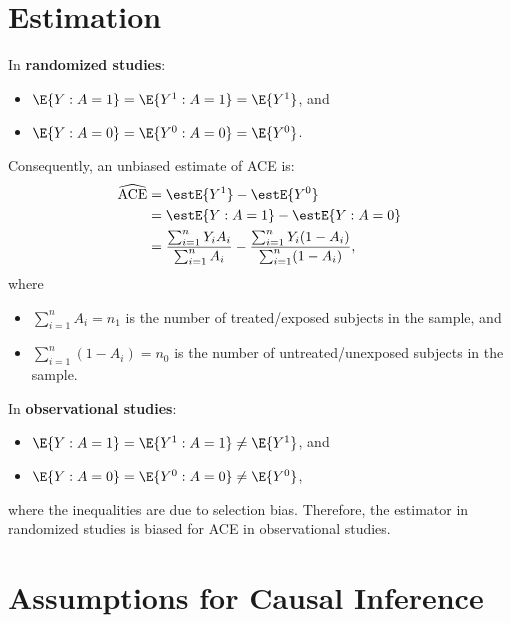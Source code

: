 \section{Estimation}
\begin{Regular}{}
    In \textbf{randomized studies}:
    \begin{itemize}
        \item $ \E{Y\given A=1}=\E{Y^1\given A=1}=\E{Y^1} $, and
        \item $ \E{Y\given A=0}=\E{Y^0\given A=0}=\E{Y^0} $.
    \end{itemize}
    Consequently, an unbiased estimate of ACE is:
    \begin{align*}
        \widehat{\ACE}
         & =\estE{Y^1}-\estE{Y^0}                                                                                   \\
         & =\estE{Y\given A=1}-\estE{Y\given A=0}                                                                   \\
         & =\frac{\sum_{i=1}^{n}Y_i A_i}{\sum_{i=1}^{n}A_i}-\frac{\sum_{i=1}^{n}Y_i(1-A_i)}{\sum_{i=1}^{n}(1-A_i)},
    \end{align*}
    where
    \begin{itemize}
        \item $ \sum_{i=1}^{n}A_i=n_1 $ is the number of treated/exposed subjects in the sample, and
        \item $ \sum_{i=1}^{n}(1-A_i)=n_0 $ is the number of untreated/unexposed subjects in the sample.
    \end{itemize}
\end{Regular}
\begin{Regular}{}
    In \textbf{observational studies}:
    \begin{itemize}
        \item $ \E{Y\given A=1}=\E{Y^1\given A=1}\ne\E{Y^1} $, and
        \item $ \E{Y\given A=0}=\E{Y^0\given A=0}\ne\E{Y^0} $,
    \end{itemize}
    where the inequalities are due to selection bias.
    Therefore, the estimator in randomized studies is biased for ACE in
    observational studies.
\end{Regular}
\section*{Assumptions for Causal Inference}
